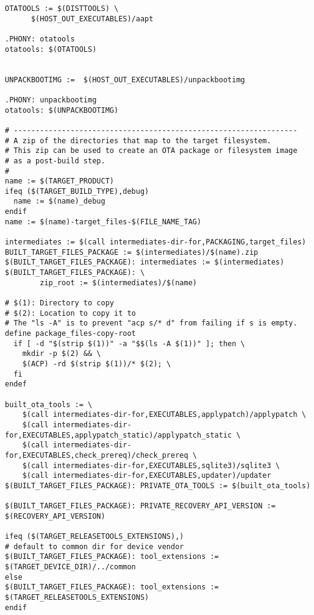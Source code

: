 \documentclass[12pt,a4paper]{article}
\begin{document}
\begin{verbatim}
OTATOOLS := $(DISTTOOLS) \
	  $(HOST_OUT_EXECUTABLES)/aapt

.PHONY: otatools
otatools: $(OTATOOLS)


UNPACKBOOTIMG :=  $(HOST_OUT_EXECUTABLES)/unpackbootimg

.PHONY: unpackbootimg
otatools: $(UNPACKBOOTIMG)

# -----------------------------------------------------------------
# A zip of the directories that map to the target filesystem.
# This zip can be used to create an OTA package or filesystem image
# as a post-build step.
#
name := $(TARGET_PRODUCT)
ifeq ($(TARGET_BUILD_TYPE),debug)
  name := $(name)_debug
endif
name := $(name)-target_files-$(FILE_NAME_TAG)

intermediates := $(call intermediates-dir-for,PACKAGING,target_files)
BUILT_TARGET_FILES_PACKAGE := $(intermediates)/$(name).zip
$(BUILT_TARGET_FILES_PACKAGE): intermediates := $(intermediates)
$(BUILT_TARGET_FILES_PACKAGE): \
		zip_root := $(intermediates)/$(name)

# $(1): Directory to copy
# $(2): Location to copy it to
# The "ls -A" is to prevent "acp s/* d" from failing if s is empty.
define package_files-copy-root
  if [ -d "$(strip $(1))" -a "$$(ls -A $(1))" ]; then \
    mkdir -p $(2) && \
    $(ACP) -rd $(strip $(1))/* $(2); \
  fi
endef

built_ota_tools := \
	$(call intermediates-dir-for,EXECUTABLES,applypatch)/applypatch \
	$(call intermediates-dir-for,EXECUTABLES,applypatch_static)/applypatch_static \
	$(call intermediates-dir-for,EXECUTABLES,check_prereq)/check_prereq \
	$(call intermediates-dir-for,EXECUTABLES,sqlite3)/sqlite3 \
	$(call intermediates-dir-for,EXECUTABLES,updater)/updater
$(BUILT_TARGET_FILES_PACKAGE): PRIVATE_OTA_TOOLS := $(built_ota_tools)

$(BUILT_TARGET_FILES_PACKAGE): PRIVATE_RECOVERY_API_VERSION := $(RECOVERY_API_VERSION)

ifeq ($(TARGET_RELEASETOOLS_EXTENSIONS),)
# default to common dir for device vendor
$(BUILT_TARGET_FILES_PACKAGE): tool_extensions := $(TARGET_DEVICE_DIR)/../common
else
$(BUILT_TARGET_FILES_PACKAGE): tool_extensions := $(TARGET_RELEASETOOLS_EXTENSIONS)
endif


\end{verbatim}
\end{document}
